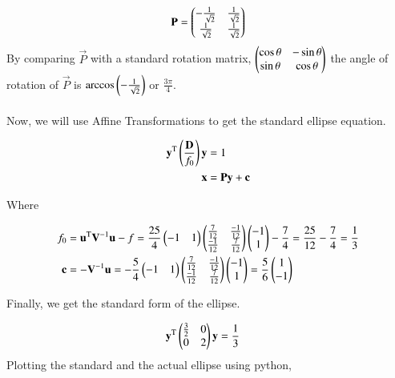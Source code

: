 \documentclass[journal]{IEEEtran}
\begin{document}
\begin{align}
	\mathbf{P} = \begin{pmatrix} - \frac{1}{\sqrt{2}} & \frac{1}{\sqrt{2}} \\ \frac{1}{\sqrt{2}} & \frac{1}{\sqrt{2}} \end{pmatrix} \label{Rdef}
\end{align}
By comparing $\vec{P}$ with a standard rotation matrix, $\begin{pmatrix}\cos\theta & -\sin\theta \\ \sin\theta & \cos\theta\end{pmatrix}$
the angle of rotation of $\vec{P}$ is $\arccos\left(- \frac{1}{\sqrt{2}}\right)$ or $\frac{3\pi}{4}$. \\\\
Now, we will use Affine Transformations to get the standard ellipse equation.

\begin{align}
	\mathbf{y}^\text{T}\left(\frac{\mathbf{D}}{f_0}\right)\mathbf{y} &= 1\\
	\mathbf{x} &= \mathbf{Py} + \mathbf{c} \label{t1}\\
\end{align}

Where 

\begin{align}
	f_0 &= \mathbf{u}^\text{T}\mathbf{V}^{-1}\mathbf{u} - f  = \frac{25}{4} \begin{pmatrix}-1 & 1\end{pmatrix} \begin{pmatrix}\frac{7}{12} & \frac{-1}{12} \\ \frac{-1}{12} & \frac{7}{12}\end{pmatrix}  \begin{pmatrix}-1 \\ 1\end{pmatrix}  - \frac{7}{4}= \frac{25}{12} -  \frac{7}{4} = \frac{1}{3}\\
	\mathbf{c} &= -\mathbf{V}^{-1}\mathbf{u} = -\frac{5}{4}  \begin{pmatrix}-1 & 1\end{pmatrix} \begin{pmatrix}\frac{7}{12} & \frac{-1}{12} \\ \frac{-1}{12} & \frac{7}{12}\end{pmatrix}\begin{pmatrix} -1 \\ 1\end{pmatrix} = \frac{5}{6}  \begin{pmatrix} 1 \\ -1\end{pmatrix}
\end{align}

Finally, we get the standard form of the ellipse.

\begin{align}
		\mathbf{y}^\text{T}\begin{pmatrix}\frac{3}{2} & 0 \\ 0 & 2\end{pmatrix}\mathbf{y} &= \frac{1}{3}
\end{align}
Plotting the standard and the actual ellipse using python,
\end{document}
